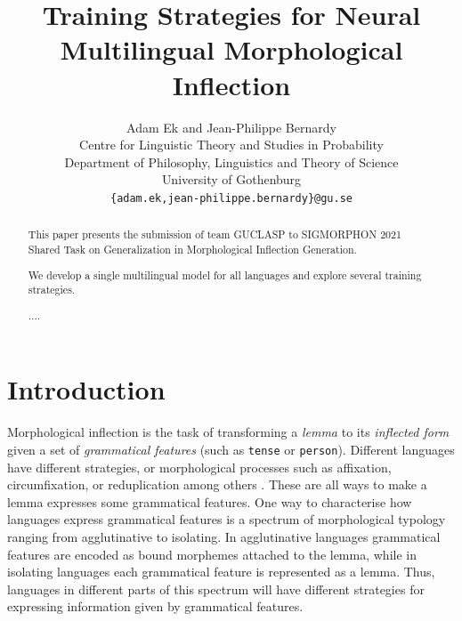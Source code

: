 \documentclass[11pt,a4paper]{article}
\title{Training Strategies for Neural Multilingual Morphological Inflection}
\author{Adam Ek and Jean-Philippe Bernardy \\
	Centre for Linguistic Theory and Studies in Probability \\
	Department of Philosophy, Linguistics and Theory of Science \\
	University of Gothenburg \\
	\texttt{\{adam.ek,jean-philippe.bernardy\}@gu.se} \\}
\date{}
\newcommand\jp[1]{\textbf{JP: #1}}
\begin{document}
\maketitle
\begin{abstract}
This paper presents the submission of team GUCLASP to SIGMORPHON
2021 Shared Task on Generalization in Morphological Inflection
Generation. 

We develop a single multilingual model for all languages and explore
several training strategies.

....
\end{abstract}

\section{Introduction}


Morphological inflection is the task of transforming a \emph{lemma} to
its \emph{inflected form} given a set of \emph{grammatical features}
(such as \texttt{tense} or \texttt{person}).  Different languages have
different strategies, or morphological processes such as affixation,
circumfixation, or reduplication among others
\cite{haspelmath2013understanding}.  These are all ways to make a
lemma expresses some grammatical features.  One way to characterise
how languages express grammatical features is a spectrum of
morphological typology ranging from agglutinative to isolating. In
agglutinative languages grammatical features are encoded as bound
morphemes attached to the lemma, while in isolating languages each
grammatical feature is represented as a lemma. Thus, languages in
different parts of this spectrum will have different strategies for
expressing information given by grammatical features.




\end{document}
